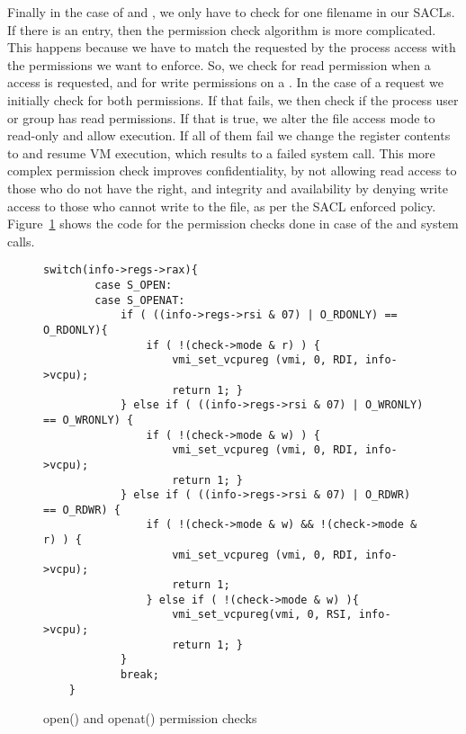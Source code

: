 \par Finally in the case of  and , we only have to check for one filename in our \ac{SACL}s. If there is an entry, then the permission check algorithm is more complicated. This happens because we have to match the requested by the process access  with the permissions we want to enforce. So, we check for read permission when a  access is requested, and for write permissions on a . In the case of a  request we initially check for both permissions. If that fails, we then check if the process user or group has read permissions. If that is true, we alter the file access mode to read-only and allow execution. If all of them fail we change the  register contents to  and resume \ac{VM} execution, which results to a failed system call. This more complex permission check improves confidentiality, by not allowing read access to those who do not have the right, and integrity and availability by denying write access to those who cannot write to the file, as per the \ac{SACL} enforced policy. Figure~\ref{fig:open} shows the code for the permission checks done in case of the  and  system calls.




\begin{figure}[ht!]
\selectfont
\begin{lstlisting}[style=CStyle]
	switch(info->regs->rax){
		case S_OPEN:
		case S_OPENAT:
			if ( ((info->regs->rsi & 07) | O_RDONLY) == O_RDONLY){
				if ( !(check->mode & r) ) {
					vmi_set_vcpureg (vmi, 0, RDI, info->vcpu);
					return 1; }
			} else if ( ((info->regs->rsi & 07) | O_WRONLY) == O_WRONLY) {
				if ( !(check->mode & w) ) {
					vmi_set_vcpureg (vmi, 0, RDI, info->vcpu);
					return 1; }
			} else if ( ((info->regs->rsi & 07) | O_RDWR) == O_RDWR) {
				if ( !(check->mode & w) && !(check->mode & r) ) {
					vmi_set_vcpureg (vmi, 0, RDI, info->vcpu);
					return 1;
				} else if ( !(check->mode & w) ){
					vmi_set_vcpureg(vmi, 0, RSI, info->vcpu);
					return 1; }
			}
			break;
	}
\end{lstlisting}
	\caption{open() and openat() permission checks}
	\label{fig:open}
\end{figure}


